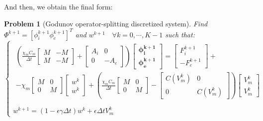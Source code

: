 \documentclass[a4paper,11pt]{article}
\newtheorem{problem}{Problem}
\begin{document}
\noindent And then, we obtain the final form:
\begin{problem}[Godunov operator-splitting discretized system] 
	Find $\Phi^{k+1}=[\phi_i^{k+1} \phi_e^{k+1}]^T$ and $w^{k+1} \quad \forall k=0, \cdots, K-1$ such that: 
\begin{equation*}
\begin{cases}
\begin{gathered}
\left(
\frac{\chi_m C_m}{\Delta t} \begin{bmatrix}M & -M \\ M & -M\end{bmatrix}
+ \begin{bmatrix} A_i & 0 \\ 0 & -A_e \end{bmatrix}
\right) \begin{bmatrix} \bm{\phi_i^{k+1}} \\ \bm{\phi_e^{k+1}}  \end{bmatrix} =
\begin{bmatrix} F_i^{k+1} \\ -F_e^{k+1} \end{bmatrix} + \\ -
\chi_m\begin{bmatrix} M & 0 \\ 0 & M \end{bmatrix} \begin{bmatrix} w^k \\ w^k \end{bmatrix} +
\left(\frac{\chi_mC_m}{\Delta t}\begin{bmatrix} M & 0 \\ 0 & M \end{bmatrix}
- \begin{bmatrix} C(V_m^k) & 0 \\ 0 & C(V_m^k)\end{bmatrix} 
\right) \begin{bmatrix} V_m^k \\ V_m^k \end {bmatrix}
\end{gathered} \\ \\
w^{k+1} = (1-\epsilon \gamma \Delta t) w^k + \epsilon \Delta tV_m^k
\end{cases}
\end{equation*}
\end{problem}\vspace{4mm}
\end{document}

